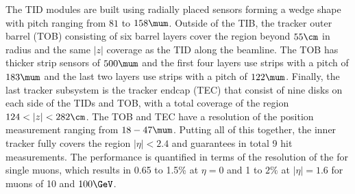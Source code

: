 The TID modules are built using radially placed sensors forming a wedge shape with pitch ranging from $81$ to $158\mum$. 
Outside of the TIB, the tracker outer barrel (TOB) consisting of six barrel layers cover the region beyond $55\cm$ in radius and the same $|z|$ coverage as the TID along the beamline.
The TOB has thicker strip sensors of $500\mum$ and the first four layers use strips with a pitch of $183\mum$ and the last two layers use strips with a pitch of $122\mum$.   
Finally, the last tracker subsystem is the tracker endcap (TEC) that consist of nine disks on each side of the TIDs and TOB, with a total coverage of the region $124<|z|<282\cm$. 
The TOB and TEC have a resolution of the position measurement ranging from $18-47\mum$. 
Putting all of this together, the inner tracker fully covers the region $|\eta|<2.4$ and guarantees in total 9 hit measurements. 
The performance is quantified in terms of the resolution of the \pt for single muons, which results in 0.65 to 1.5\% at $\eta=0$ and 1 to $2\%$ at $|\eta|=1.6$ for muons of 10 and $100\GeV$. 

